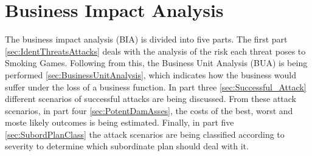\section{Business Impact Analysis}
The business impact analysis (BIA) is divided into five parts\cite{whitman1}. The first part \ref{sec:IdentThreatsAttacks} deals with the analysis of the risk each threat poses to Smoking Games. Following from this, the Business Unit Analysis (BUA) is being performed \ref{sec:BusinessUnitAnalysis}, which indicates how the business would suffer under the loss of a business function. In part three \ref{sec:Successful_Attack} different scenarios of successful attacks are being discussed. From these attack scenarios, in part four \ref{sec:PotentDamAsses}, the costs of the best, worst and moste likely outcomes is being estimated. Finally, in part five \ref{sec:SubordPlanClass} the attack scenarios are being classified according to severity to determine which subordinate plan should deal with it.






